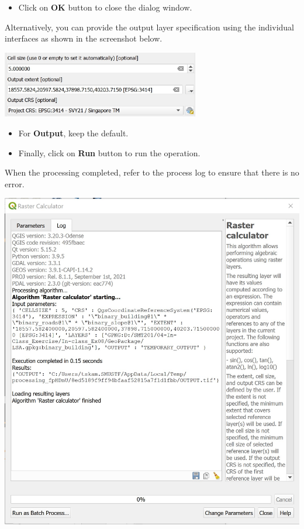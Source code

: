 \documentclass[
  letterpaper,
  DIV=11,
  numbers=noendperiod]{scrreprt}
\providecommand{\tightlist}{%
  \setlength{\itemsep}{0pt}\setlength{\parskip}{0pt}}\usepackage{longtable,booktabs,array}
\begin{document}
\begin{itemize}
\tightlist
\item
  Click on \textbf{OK} button to close the dialog window.
\end{itemize}

Alternatively, you can provide the output layer specification using the
individual interfaces as shown in the screenshot below.

\includegraphics[width=0.65\textwidth,height=\textheight]{./img07/image44.jpg}

\begin{itemize}
\tightlist
\item
  For \textbf{Output}, keep the default.
\item
  Finally, click on \textbf{Run} button to run the operation.
\end{itemize}

When the processing completed, refer to the process log to ensure that
there is no error.

\includegraphics{./img07/image45.jpg}
\end{document}
